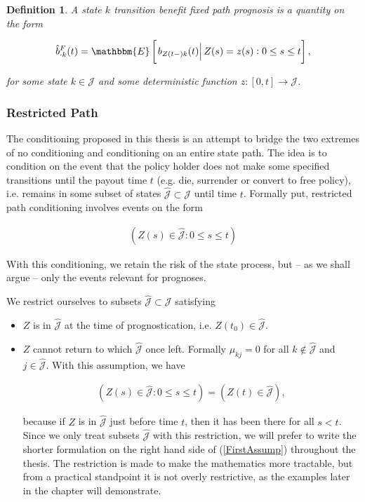 \documentclass{article}
\newcommand{\1}[1]{\mathbbm{1}_{\left\lbrace #1 \right\rbrace}}
\newcommand{\econd}[2][def]{\mathbbm{E} \left[ \left. #1 \right| #2 \right]}
\theoremstyle{break}
\newtheorem{definition}{Definition}[section]
\theoremstyle{remark}
\numberwithin{equation}{section}
\begin{document}
\begin{definition}
	A state $k$ transition benefit fixed path prognosis is a quantity on the form
	
	\begin{gather*}
		\hat{b}_{\cdot k}^F(t) = \econd[b_{Z(t-)k}(t)]{ Z(s) = z(s) : 0 \leq s \leq t},
	\end{gather*}
	
	for some state $k \in \mathcal{J}$ and some deterministic function $z: [0,t] \to \mathcal{J}$.
\end{definition}

\subsubsection{Restricted Path}

The conditioning proposed in this thesis is an attempt to bridge the two extremes of no conditioning and conditioning on an entire state path. The idea is to condition on the event that the policy holder does not make some specified transitions until the payout time $t$ (e.g. die, surrender or convert to free policy), i.e. remains in some subset of states $\hat{\mathcal{J}} \subset \mathcal{J}$ until time $t$. Formally put, restricted path conditioning involves events on the form

\begin{align} \label{FirstCond}
	\left( Z(s) \in \hat{\mathcal{J}} : 0 \leq s \leq t \right)
\end{align}

With this conditioning, we retain the risk of the state process, but -- as we shall argue -- only the events relevant for prognoses.

We restrict ourselves to subsets $\hat{\mathcal{J}} \subset \mathcal{J}$ satisfying

\begin{itemize}
	\item $Z$ is in $\hat{\mathcal{J}}$ at the time of prognostication, i.e. $Z(t_0) \in \hat{\mathcal{J}}$.
	\item $Z$ cannot return to which $\hat{\mathcal{J}}$ once left. Formally $\mu_{kj} = 0$ for all $k \notin \hat{\mathcal{J}}$ and $j \in \hat{\mathcal{J}}$. With this assumption, we have
	
	\begin{align} \label{FirstAssump}
		\left( Z(s) \in \hat{\mathcal{J}} : 0 \leq s \leq t \right) = \left( Z(t) \in \hat{\mathcal{J}} \right),
	\end{align}
	
	because if $Z$ is in $\hat{\mathcal{J}}$ just before time $t$, then it has been there for all $s < t$. Since we only treat subsets $\hat{\mathcal{J}}$ with this restriction, we will prefer to write the shorter formulation on the right hand side of (\ref{FirstAssump}) throughout the thesis. The restriction is made to make the mathematics more tractable, but from a practical standpoint it is not overly restrictive, as the examples later in the chapter will demonstrate. 
\end{itemize}
\end{document}
